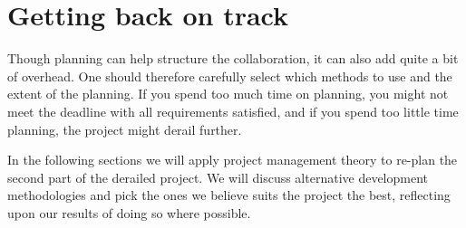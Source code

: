\section{Getting back on track}
Though planning can help structure the collaboration, it can also add quite a bit of overhead. One should therefore carefully select which methods to use and the extent of the planning. If you spend too much time on planning, you might not meet the deadline with all requirements satisfied, and if you spend too little time planning, the project might derail further.

In the following sections we will apply project management theory to re-plan the second part of the derailed project. We will discuss alternative development methodologies and pick the ones we believe suits the project the best, reflecting upon our results of doing so where possible.






\newpage